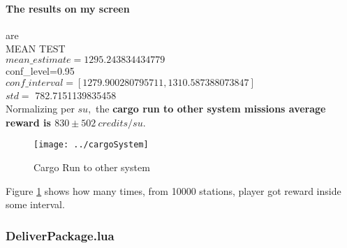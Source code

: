 \documentclass[]{article}
\begin{document}
\paragraph*{The results on my screen} are\\
MEAN TEST\\
$mean\_estimate=1295.243834434779$\\
conf\_level=0.95\\
$conf\_interval=[1279.900280795711,1310.587388073847]$\\
$std=$ 782.7151139835458\\
Normalizing per $su,$ the \textbf{cargo run to other system missions average reward is $830\pm502\ credits/su.$}
\begin{figure}[h]
	\centering
	\texttt{[image: ../cargoSystem]}
	\caption{Cargo Run to other system}
	\label{fig:cargosystem}
\end{figure}

Figure \ref{fig:cargosystem} shows how many times, from 10000 stations, player got reward inside some interval.\\ 

\subsubsection{DeliverPackage.lua}
\end{document}
